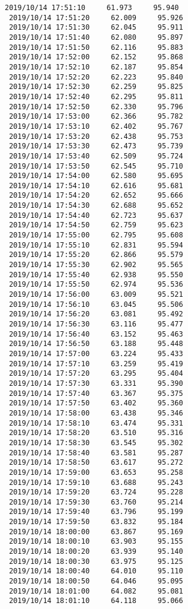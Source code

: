 \documentclass[11pt]{article}
\begin{document}
\begin{Verbatim}[commandchars=\\\{\}]
 2019/10/14 17:51:10     61.973     95.940
 2019/10/14 17:51:20     62.009     95.926
 2019/10/14 17:51:30     62.045     95.911
 2019/10/14 17:51:40     62.080     95.897
 2019/10/14 17:51:50     62.116     95.883
 2019/10/14 17:52:00     62.152     95.868
 2019/10/14 17:52:10     62.187     95.854
 2019/10/14 17:52:20     62.223     95.840
 2019/10/14 17:52:30     62.259     95.825
 2019/10/14 17:52:40     62.295     95.811
 2019/10/14 17:52:50     62.330     95.796
 2019/10/14 17:53:00     62.366     95.782
 2019/10/14 17:53:10     62.402     95.767
 2019/10/14 17:53:20     62.438     95.753
 2019/10/14 17:53:30     62.473     95.739
 2019/10/14 17:53:40     62.509     95.724
 2019/10/14 17:53:50     62.545     95.710
 2019/10/14 17:54:00     62.580     95.695
 2019/10/14 17:54:10     62.616     95.681
 2019/10/14 17:54:20     62.652     95.666
 2019/10/14 17:54:30     62.688     95.652
 2019/10/14 17:54:40     62.723     95.637
 2019/10/14 17:54:50     62.759     95.623
 2019/10/14 17:55:00     62.795     95.608
 2019/10/14 17:55:10     62.831     95.594
 2019/10/14 17:55:20     62.866     95.579
 2019/10/14 17:55:30     62.902     95.565
 2019/10/14 17:55:40     62.938     95.550
 2019/10/14 17:55:50     62.974     95.536
 2019/10/14 17:56:00     63.009     95.521
 2019/10/14 17:56:10     63.045     95.506
 2019/10/14 17:56:20     63.081     95.492
 2019/10/14 17:56:30     63.116     95.477
 2019/10/14 17:56:40     63.152     95.463
 2019/10/14 17:56:50     63.188     95.448
 2019/10/14 17:57:00     63.224     95.433
 2019/10/14 17:57:10     63.259     95.419
 2019/10/14 17:57:20     63.295     95.404
 2019/10/14 17:57:30     63.331     95.390
 2019/10/14 17:57:40     63.367     95.375
 2019/10/14 17:57:50     63.402     95.360
 2019/10/14 17:58:00     63.438     95.346
 2019/10/14 17:58:10     63.474     95.331
 2019/10/14 17:58:20     63.510     95.316
 2019/10/14 17:58:30     63.545     95.302
 2019/10/14 17:58:40     63.581     95.287
 2019/10/14 17:58:50     63.617     95.272
 2019/10/14 17:59:00     63.653     95.258
 2019/10/14 17:59:10     63.688     95.243
 2019/10/14 17:59:20     63.724     95.228
 2019/10/14 17:59:30     63.760     95.214
 2019/10/14 17:59:40     63.796     95.199
 2019/10/14 17:59:50     63.832     95.184
 2019/10/14 18:00:00     63.867     95.169
 2019/10/14 18:00:10     63.903     95.155
 2019/10/14 18:00:20     63.939     95.140
 2019/10/14 18:00:30     63.975     95.125
 2019/10/14 18:00:40     64.010     95.110
 2019/10/14 18:00:50     64.046     95.095
 2019/10/14 18:01:00     64.082     95.081
 2019/10/14 18:01:10     64.118     95.066

\end{Verbatim}
\end{document}
